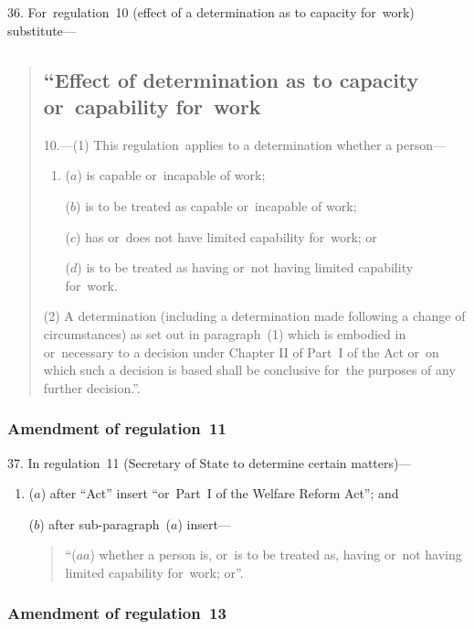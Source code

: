 \documentclass[12pt,a4paper]{article}
\begin{document}
36.  For~regulation~10 (effect of a determination as to capacity for~work) substitute—
\begin{quotation}
\subsection*{“Effect of determination as to capacity or~capability for~work}

10.---(1)  This regulation~applies to a determination whether a person—
\begin{enumerate}\item[]
($a$) is capable or~incapable of work;

($b$) is to be treated as capable or~incapable of work;

($c$) has or~does not have limited capability for~work; or

($d$) is to be treated as having or~not having limited capability for~work.
\end{enumerate}

(2) A determination (including a determination made following a change of circumstances) as set out in paragraph~(1) which is embodied in or~necessary to a decision under Chapter II of Part~I of the Act or~on which such a decision is based shall be conclusive for~the purposes of any further decision.”.
\end{quotation}

\subsubsection[37. Amendment of regulation~11]{Amendment of regulation~11}

37.  In regulation~11 (Secretary of State to determine certain matters)—
\begin{enumerate}\item[]
($a$) after “Act” insert “or~Part~I of the Welfare Reform Act”; and

($b$) after sub-paragraph~($a$)  insert—
\begin{quotation}
“($aa$) whether a person is, or~is to be treated as, having or~not having limited capability for~work; or”.
\end{quotation}
\end{enumerate}

\subsubsection[38. Amendment of regulation~13]{Amendment of regulation~13}
\end{document}
